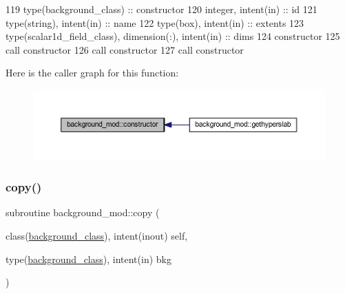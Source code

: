 \begin{DoxyCode}
119     \textcolor{keywordtype}{type}(background\_class) :: constructor
120     \textcolor{keywordtype}{integer}, \textcolor{keywordtype}{intent(in)} :: id
121     \textcolor{keywordtype}{type}(string), \textcolor{keywordtype}{intent(in)} :: name
122     \textcolor{keywordtype}{type}(box), \textcolor{keywordtype}{intent(in)} :: extents
123     \textcolor{keywordtype}{type}(scalar1d\_field\_class), \textcolor{keywordtype}{dimension(:)}, \textcolor{keywordtype}{intent(in)} :: dims
124     constructor%
125     \textcolor{keyword}{call }constructor%
126     \textcolor{keyword}{call }constructor%
127     \textcolor{keyword}{call }constructor%
\end{DoxyCode}
Here is the caller graph for this function\+:\nopagebreak
\begin{figure}[H]
\begin{center}
\leavevmode
\includegraphics[width=350pt]{namespacebackground__mod_ad0096fb6a5a11854fd70a7ce58dc3000_icgraph}
\end{center}
\end{figure}
\mbox{\label{namespacebackground__mod_ac6241a19bbe0f4b2482f95ed3d84056d}} 
\subsubsection{\texorpdfstring{copy()}{copy()}}
{\footnotesize\ttfamily subroutine background\+\_\+mod\+::copy (\begin{DoxyParamCaption}\item[{class(\mbox{\hyperlink{structbackground__mod_1_1background__class}{background\+\_\+class}}), intent(inout)}]{self,  }\item[{type(\mbox{\hyperlink{structbackground__mod_1_1background__class}{background\+\_\+class}}), intent(in)}]{bkg }\end{DoxyParamCaption})\hspace{0.3cm}{\ttfamily [private]}}



